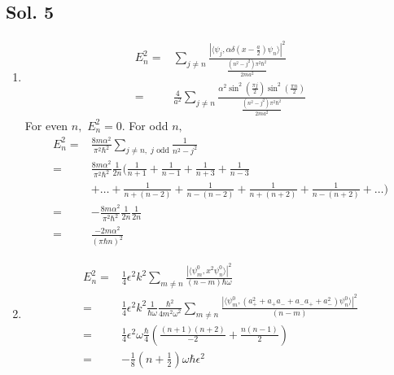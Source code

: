 \subsection*{Sol. 5}
\begin{enumerate}
    \item 
    \begin{align*}
        E_n^2 = &
        \sum_{j\neq n}
        \frac{|\langle
        \psi_j, \alpha\delta(x-\frac{a}{2})\psi_n
        \rangle|^2}{\frac{(n^2-j^2)\pi^2\hbar^2}{2ma^2}}\\
        =&
        \frac{4}{a^2}\sum_{j\neq n}
        \frac{\alpha^2\sin^2(\frac{\pi j}{2})\sin^2(\frac{\pi n}{2})}{\frac{(n^2-j^2)\pi^2\hbar^2}{2ma^2}}
    \end{align*}
    For even $n,$ $E_n^2=0.$ For odd $n,$
    \begin{align*}
        E_n^2 =& \frac{8m\alpha^2}{\pi^2\hbar^2}\sum_{j\neq n, \;j\text{ odd}}
        \frac{1}{n^2-j^2}\\
        =&\frac{8m\alpha^2}{\pi^2\hbar^2}\frac{1}{2n}
        \bigg(
        \frac{1}{n+1} + \frac{1}{n-1} + \frac{1}{n+3}
        +\frac{1}{n-3}\\
        &+ \dots + \frac{1}{n+(n-2)}
        + \frac{1}{n-(n-2)}
        + \frac{1}{n+(n+2)}
        + \frac{1}{n-(n+2)}
        +\dots
        \bigg)\\
        =&-\frac{8m\alpha^2}{\pi^2\hbar^2}\frac{1}{2n}\frac{1}{2n}\\
        =&\frac{-2m\alpha^2}{(\pi\hbar n)^2}
    \end{align*}
    \item 
    \begin{align*}
        E_n^2 =&\frac{1}{4}\epsilon^2k^2 \sum_{m\neq n}
        \frac{|\langle\psi_m^0, x^2 \psi_n^0\rangle|^2}{(n-m)\hbar\omega}\\
        =&\frac{1}{4}\epsilon^2k^2
        \frac{1}{\hbar\omega}
        \frac{\hbar^2}{4m^2\omega^2}
        \sum_{m\neq n}
        \frac{|\langle\psi_m^0, (a_+^2+a_+a_-+a_-a_++a_-^2) \psi_n^0\rangle|^2}{(n-m)}\\
        =&
        \frac{1}{4}\epsilon^2\omega
        \frac{\hbar}{4}
        \left(\frac{(n+1)(n+2)}{-2}
        +\frac{n(n-1)}{2}
        \right)\\
        =&-\frac{1}{8}(n+\frac{1}{2})\omega\hbar\epsilon^2
    \end{align*}
\end{enumerate}

